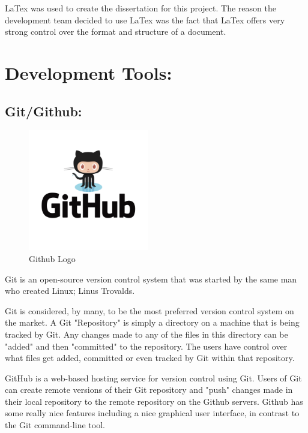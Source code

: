 \bigskip

LaTex was used to create the dissertation for this project. The reason the development team decided to use LaTex was the fact that LaTex offers very strong control over the format and structure of a document. 

\section{Development Tools:}
\label{sec:TechnologyReviewDevTools}
\subsection{Git/Github:}
\label{sec:TechnologyReviewGithub}

\begin{figure}[H]
    \centering
    \includegraphics[width=\textwidth, height=150pt]{img/GitHubLogo.PNG}
    \caption{Github Logo}
    \label{fig:my_label}
\end{figure}

\bigskip

Git is an open-source version control system that was started by the same man who created Linux; Linus Trovalds.

Git is considered, by many, to be the most preferred version control system on the market. A Git "Repository" is simply a directory on a machine that is being tracked by Git. Any changes made to any of the files in this directory can be "added" and then "committed" to the repository. The users have control over what files get added, committed or even tracked by Git within that repository. 

\bigskip

GitHub is a web-based hosting service for version control using Git. Users of Git can create remote versions of their Git repository and "push" changes made in their local repository to the remote repository on the Github servers.  Github has some really nice features including a nice graphical user interface, in contrast to the Git command-line tool. 

